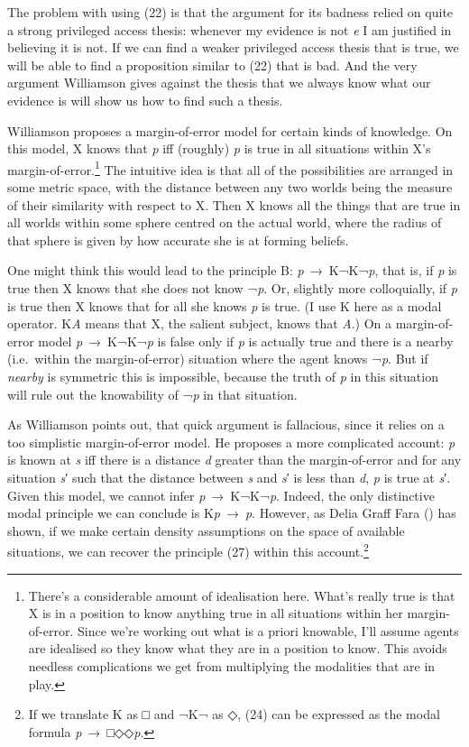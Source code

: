 \documentclass[
  11pt,
  letterpaper,
  DIV=11,
  numbers=noendperiod,
  twoside]{scrartcl}
\begin{document}
The problem with using (22) is that the argument for its badness relied
on quite a strong privileged access thesis: whenever my evidence is not
\emph{e} I am justified in believing it is not. If we can find a weaker
privileged access thesis that is true, we will be able to find a
proposition similar to (22) that is bad. And the very argument
Williamson gives against the thesis that we always know what our
evidence is will show us how to find such a thesis.

Williamson proposes a margin-of-error model for certain kinds of
knowledge. On this model, X knows that \emph{p} iff (roughly) \emph{p}
is true in all situations within X's margin-of-error.\footnote{There's a
  considerable amount of idealisation here. What's really true is that X
  is in a position to know anything true in all situations within her
  margin-of-error. Since we're working out what is a priori knowable,
  I'll assume agents are idealised so they know what they are in a
  position to know. This avoids needless complications we get from
  multiplying the modalities that are in play.} The intuitive idea is
that all of the possibilities are arranged in some metric space, with
the distance between any two worlds being the measure of their
similarity with respect to X. Then X knows all the things that are true
in all worlds within some sphere centred on the actual world, where the
radius of that sphere is given by how accurate she is at forming
beliefs.

One might think this would lead to the principle B:
\emph{p}~→~K¬K¬\emph{p}, that is, if \emph{p} is true then X knows that
she does not know ¬\emph{p}. Or, slightly more colloquially, if \emph{p}
is true then X knows that for all she knows \emph{p} is true. (I use K
here as a modal operator. K\emph{A} means that X, the salient subject,
knows that \emph{A}.) On a margin-of-error model \emph{p}~→~K¬K¬\emph{p}
is false only if \emph{p} is actually true and there is a nearby
(i.e.~within the margin-of-error) situation where the agent knows
¬\emph{p}. But if \emph{nearby} is symmetric this is impossible, because
the truth of \emph{p} in this situation will rule out the knowability of
¬\emph{p} in that situation.

As Williamson points out, that quick argument is fallacious, since it
relies on a too simplistic margin-of-error model. He proposes a more
complicated account: \emph{p} is known at \emph{s} iff there is a
distance \emph{d} greater than the margin-of-error and for any situation
\emph{s}′ such that the distance between \emph{s} and \emph{s}′ is less
than \emph{d}, \emph{p} is true at \emph{s}′. Given this model, we
cannot infer \emph{p}~→~K¬K¬\emph{p}. Indeed, the only distinctive modal
principle we can conclude is K\emph{p}~→~\emph{p}. However, as Delia
Graff Fara () has shown, if we make certain
density assumptions on the space of available situations, we can recover
the principle (27) within this account.\footnote{If we translate K as □
  and ¬K¬ as ◇, (24) can be expressed as the modal formula
  \emph{p}~→~□◇◇\emph{p}.}
\end{document}

